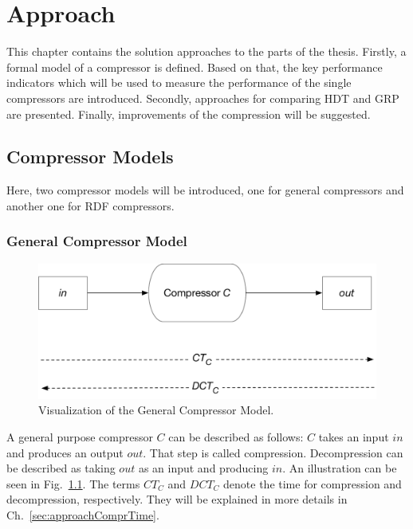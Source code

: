 \chapter{Approach}\label{ch:approach}

This chapter contains the solution approaches to the parts of the thesis. Firstly, a formal model of a compressor is defined. Based on that, the key performance indicators which will be used to measure the performance of the single compressors are introduced. Secondly, approaches for comparing HDT and GRP are presented. Finally, improvements of the compression will be suggested.


\section{Compressor Models}

Here, two compressor models will be introduced, one for general compressors and another one for RDF compressors. 

\subsection{General Compressor Model}\label{sec:generalcompressorModel}

\begin{figure}
	\centering
	\includegraphics[width=0.8\linewidth]{figures/approach/model_general}
	\caption{Visualization of the General Compressor Model.}
	\label{fig:generalcompressorModel}
\end{figure}

A general purpose compressor $C$ can be described as follows: $C$ takes an input $in$ and produces an output $out$. That step is called compression. Decompression can be described as taking $out$ as an input and producing $in$. An illustration can be seen in Fig.~\ref{fig:generalcompressorModel}. The terms $CT_C$ and $DCT_C$ denote the time for compression and decompression, respectively. They will be explained in more details in Ch.~\ref{sec:approachComprTime}.


